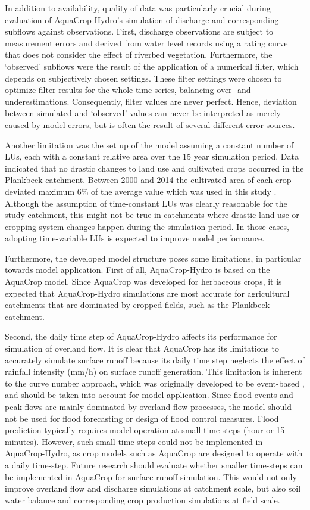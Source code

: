 In addition to availability, quality of data was particularly crucial during evaluation of AquaCrop-Hydro's simulation of discharge and corresponding subflows against observations. First, discharge observations are subject to measurement errors and derived from water level records using a rating curve that does not consider the effect of riverbed vegetation. Furthermore, the `observed' subflows were the result of the application of a numerical filter, which depends on subjectively chosen settings. These filter settings were chosen to optimize filter results for the whole time series, balancing over- and underestimations. Consequently, filter values are never perfect. Hence, deviation between simulated and `observed' values can never be interpreted as merely caused by model errors, but is often the result of several different error sources. 

Another limitation was the set up of the model assuming a constant number of LUs, each with a constant relative area over the 15 year simulation period. Data indicated that no drastic changes to land use and cultivated crops occurred in the Plankbeek catchment. Between 2000 and 2014 the cultivated area of each crop deviated maximum 6\% of the average value which was used in this study \parencite{vlm2014}. Although the assumption of time-constant LUs was clearly reasonable for the study catchment, this might not be true in catchments where drastic land use or cropping system changes happen during the simulation period. In those cases, adopting time-variable LUs is expected to improve model performance. 

Furthermore, the developed model structure poses some limitations, in particular towards model application. First of all, AquaCrop-Hydro is based on the AquaCrop model. Since AquaCrop was developed for herbaceous crops, it is expected that AquaCrop-Hydro simulations are most accurate for agricultural catchments that are dominated by cropped fields, such as the Plankbeek catchment.

Second, the daily time step of AquaCrop-Hydro affects its performance for simulation of overland flow. It is clear that AquaCrop has its limitations to accurately simulate surface runoff because its daily time step neglects the effect of rainfall intensity (mm/h) on surface runoff generation. This limitation is inherent to the curve number approach, which was originally developed to be event-based \parencite{garen2005, hawkins2009}, and should be taken into account for model application. Since flood events and peak flows are mainly dominated by overland flow processes, the model should not be used for flood forecasting or design of flood control measures. Flood prediction typically requires model operation at small time steps (hour or 15 minutes). However, such small time-steps could not be implemented in AquaCrop-Hydro, as crop models such as AquaCrop are designed to operate with a daily time-step. Future research should evaluate whether smaller time-steps can be implemented in AquaCrop for surface runoff simulation. This would not only improve overland flow and discharge simulations at catchment scale, but also soil water balance and corresponding crop production simulations at field scale.

